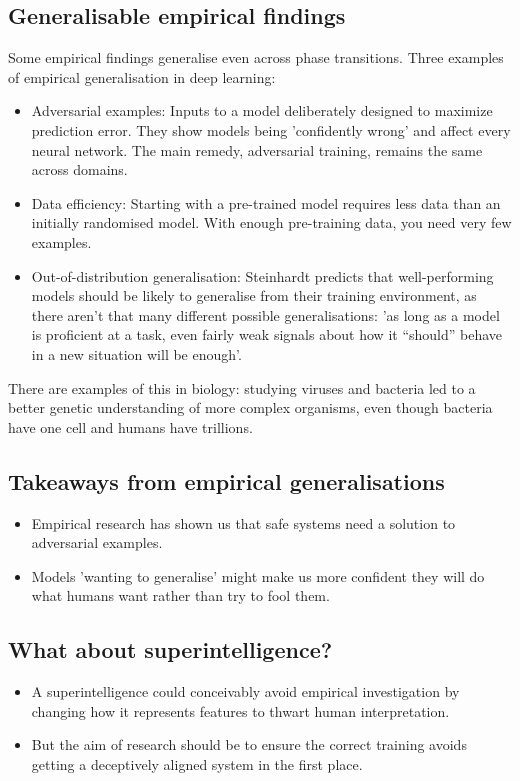 \documentclass{article}
\begin{document}
\begin{multicols}{2}
\subsection*{Generalisable empirical findings}
Some empirical findings generalise even across phase transitions. Three examples of empirical generalisation in deep learning:
\begin{itemize}
    \item Adversarial examples: Inputs to a model deliberately designed to maximize prediction error. They show models being 'confidently wrong' and affect every neural network. The main remedy, adversarial training, remains the same across domains.
    \item Data efficiency: Starting with a pre-trained model requires less data than an initially randomised model. With enough pre-training data, you need very few examples.
    \item Out-of-distribution generalisation: Steinhardt predicts that well-performing models should be likely to generalise from their training environment, as there aren't that many different possible generalisations: 'as long as a model is proficient at a task, even fairly weak signals about how it “should” behave in a new situation will be enough'.
\end{itemize}
There are examples of this in biology: studying viruses and bacteria led to a better genetic understanding of more complex organisms, even though bacteria have one cell and humans have trillions.

\subsection*{Takeaways from empirical generalisations}
\begin{itemize}
    \item Empirical research has shown us that safe systems need a solution to adversarial examples.
    \item Models 'wanting to generalise' might make us more confident they will do what humans want rather than try to fool them.
\end{itemize}

\subsection*{What about superintelligence?}
\begin{itemize}
    \item A superintelligence could conceivably avoid empirical investigation by changing how it represents features to thwart human interpretation.
    \item But the aim of research should be to ensure the correct training avoids getting a deceptively aligned system in the first place.
\end{itemize}


\end{multicols}
\end{document}
